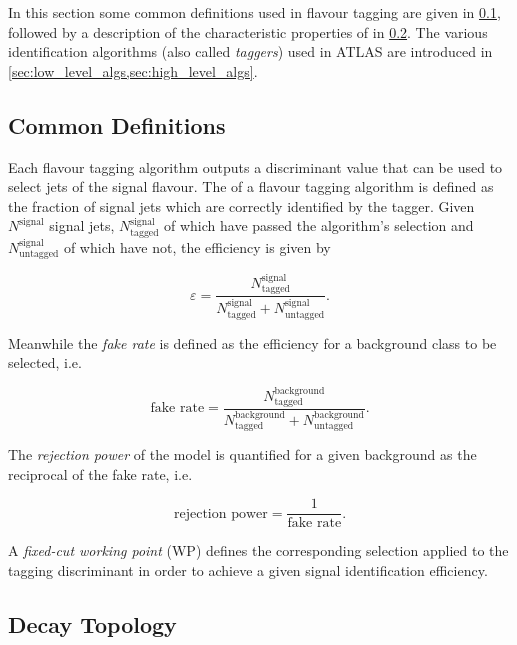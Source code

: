 In this section some common definitions used in flavour tagging are given in \cref{sec:ftag_defs}, followed by a description of the characteristic properties of \bjets in \cref{sec:b_decay_topology}.
The various \bjet identification algorithms (also called \textit{taggers}) used in ATLAS are introduced in \cref{sec:low_level_algs,sec:high_level_algs}.


\subsection{Common Definitions}\label{sec:ftag_defs}

Each flavour tagging algorithm outputs a discriminant value that can be used to select jets of the signal flavour.
The  of a flavour tagging algorithm is defined as the fraction of signal jets which are correctly identified by the tagger.
Given $N^{\text{signal}}$ signal jets, $N^{\text{signal}}_{\text{tagged}}$ of which have passed the algorithm's selection and $N^{\text{signal}}_{\text{untagged}}$ of which have not, the efficiency is given by

\begin{equation}
\varepsilon = \frac{N^{\text{signal}}_{\text{tagged}}}{N^{\text{signal}}_{\text{tagged}} + N^{\text{signal}}_{\text{untagged}}} .
\end{equation}

Meanwhile the \textit{fake rate} is defined as the efficiency for a background class to be selected, i.e.

\begin{equation}
\text{fake rate} = \frac{N^{\text{background}}_{\text{tagged}}}{N^{\text{background}}_{\text{tagged}} + N^{\text{background}}_{\text{untagged}}} .
\end{equation}

The \textit{rejection power} of the model is quantified for a given background as the reciprocal of the fake rate, i.e.

\begin{equation}
\text{rejection power} = \frac{1}{\text{fake rate}} .
\end{equation}

A \textit{fixed-cut working point} (WP) defines the corresponding selection applied to the tagging discriminant in order to achieve a given signal identification efficiency.


\subsection{Decay Topology}
\label{sec:b_decay_topology}

